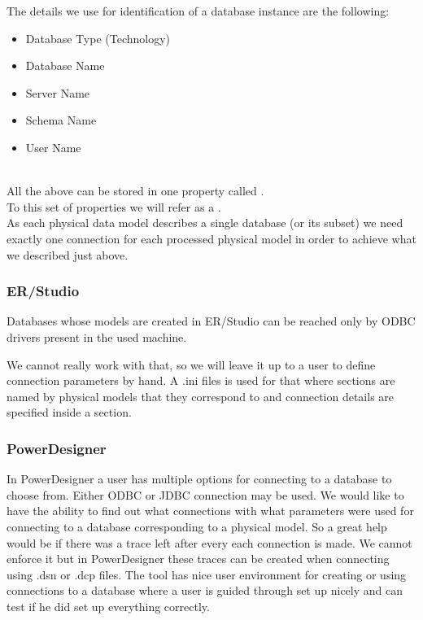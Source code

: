 The details we use for identification of a database instance are the following:
\begin{itemize}
	\item Database Type (Technology)
	\item Database Name
	\item Server Name
	\item Schema Name
	\item User Name
\end{itemize} \\
All the above can be stored in one property called .\\
To this set of properties we will refer as a . \\
As each physical data model describes a single database (or its subset) we need exactly one connection for each processed physical model in order to achieve what we described just above.

\subsubsection{ER/Studio}

Databases whose models are created in ER/Studio can be reached only by ODBC drivers present in the used machine.

We cannot really work with that, so we will leave it up to a user to define connection parameters by hand.
A .ini files \label{ini_connections}is used for that where sections are named by physical models that they correspond to and connection details are specified inside a section. 



\subsubsection{PowerDesigner}

In PowerDesigner a user has multiple options for connecting to a database to choose from. Either ODBC or JDBC connection may be used. 
We would like to have the ability to find out what connections with what parameters were used for connecting to a database corresponding to a physical model. So a great help would be if there was a trace left after every each connection is made. We cannot enforce it but in PowerDesigner these traces can be created when connecting using .dsn or .dcp files.
The tool has nice user environment for creating or using connections to a database where a user is guided through set up nicely and can test if he did set up everything correctly. \\

